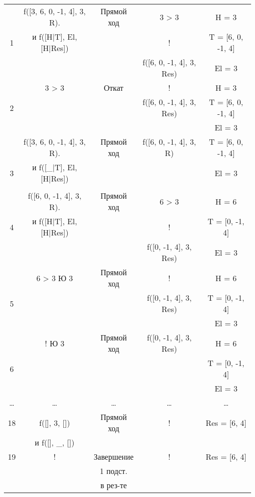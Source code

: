 \begin{landscape}
\begin{longtable}{|c|c|c|c|c|}
        \hline
              & f([3, 6, 0, -1, 4], 3, R). & Прямой ход & 3 > 3 & H = 3\\
            1 & и f([H|T], El, [H|Res]) & & ! & T = [6, 0, -1, 4]\\
			  & & & f([6, 0, -1, 4], 3, Res) & El = 3\\
			\hline
              & 3 > 3 & Откат & ! & H = 3\\
            2 & & & f([6, 0, -1, 4], 3, Res) & T = [6, 0, -1, 4]\\
			  & & & & El = 3\\
			\hline
              & f([3, 6, 0, -1, 4], 3, R). & Прямой ход & f([6, 0, -1, 4], 3, R) & T = [6, 0, -1, 4]\\
            3 & и f([\_|T], El, [H|Res]) & & & El = 3\\
			  & & & & \\
			\hline
			  & f([6, 0, -1, 4], 3, R). & Прямой ход & 6 > 3 & H = 6\\
            4 & и f([H|T], El, [H|Res]) & & ! & T = [0, -1, 4]\\
			  & & & f([0, -1, 4], 3, Res) & El = 3\\
			\hline
			  & 6 > 3 Ю 3 & Прямой ход & ! & H = 6\\
            5 & & & f([0, -1, 4], 3, Res) & T = [0, -1, 4]\\
			  & & &  & El = 3\\
			\hline
              & ! Ю 3 & Прямой ход & f([0, -1, 4], 3, Res) & H = 6\\
            6 & & & & T = [0, -1, 4]\\
			  & & & & El = 3\\
			\hline
			\hline
			\dots & \dots & \dots & \dots & \dots \\
			\hline 
			18 & f([], 3, []) & Прямой ход & ! & Res = [6, 4]\\
              & и f([], \_, []) & & &\\
            \hline 
			19 & ! & Завершение & ! & Res = [6, 4]\\
              & & 1 подст. & &\\
              & & в рез-те & &\\
    \end{longtable}
\end{landscape}